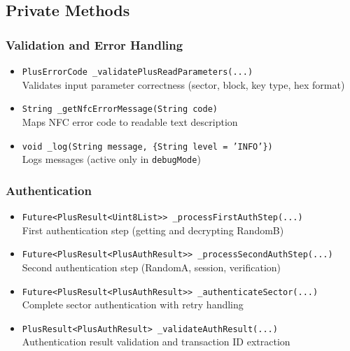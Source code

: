 \documentclass[a4paper,12pt]{article}
\begin{document}
\subsection{Private Methods}

\subsubsection*{Validation and Error Handling}
\begin{itemize}
    \item \texttt{PlusErrorCode \_validatePlusReadParameters(...)}\\
    Validates input parameter correctness (sector, block, key type, hex format)
    
    \item \texttt{String \_getNfcErrorMessage(String code)}\\
    Maps NFC error code to readable text description
    
    \item \texttt{void \_log(String message, \{String level = 'INFO'\})}\\
    Logs messages (active only in \texttt{debugMode})
\end{itemize}

\subsubsection*{Authentication}
\begin{itemize}
    \item \texttt{Future<PlusResult<Uint8List>> \_processFirstAuthStep(...)}\\
    First authentication step (getting and decrypting RandomB)
    
    \item \texttt{Future<PlusResult<PlusAuthResult>> \_processSecondAuthStep(...)}\\
    Second authentication step (RandomA, session, verification)
    
    \item \texttt{Future<PlusResult<PlusAuthResult>> \_authenticateSector(...)}\\
    Complete sector authentication with retry handling
    
    \item \texttt{PlusResult<PlusAuthResult> \_validateAuthResult(...)}\\
    Authentication result validation and transaction ID extraction
\end{itemize}
\end{document}
